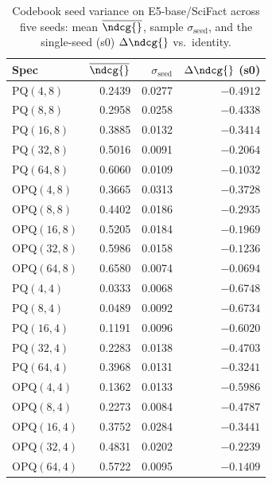 \begin{table}[t]
\centering
\small
\caption{Codebook seed variance on E5-base/SciFact across five seeds: mean $\overline{\ndcg{}}$, sample $\sigma_{\text{seed}}$, and the single-seed (s0) $\Delta\ndcg{}$ vs.\ identity.}
\label{tab:seed-variance-e5-base-scifact}
\begin{tabular}{lrrr}
\toprule
Spec & $\overline{\ndcg{}}$ & $\sigma_{\text{seed}}$ & $\Delta\ndcg{}$ (s0) \\
\midrule
PQ$(4,8)$ & 0.2439 & 0.0277 & $-0.4912$ \\
PQ$(8,8)$ & 0.2958 & 0.0258 & $-0.4338$ \\
PQ$(16,8)$ & 0.3885 & 0.0132 & $-0.3414$ \\
PQ$(32,8)$ & 0.5016 & 0.0091 & $-0.2064$ \\
PQ$(64,8)$ & 0.6060 & 0.0109 & $-0.1032$ \\
OPQ$(4,8)$ & 0.3665 & 0.0313 & $-0.3728$ \\
OPQ$(8,8)$ & 0.4402 & 0.0186 & $-0.2935$ \\
OPQ$(16,8)$ & 0.5205 & 0.0184 & $-0.1969$ \\
OPQ$(32,8)$ & 0.5986 & 0.0158 & $-0.1236$ \\
OPQ$(64,8)$ & 0.6580 & 0.0074 & $-0.0694$ \\
PQ$(4,4)$ & 0.0333 & 0.0068 & $-0.6748$ \\
PQ$(8,4)$ & 0.0489 & 0.0092 & $-0.6734$ \\
PQ$(16,4)$ & 0.1191 & 0.0096 & $-0.6020$ \\
PQ$(32,4)$ & 0.2283 & 0.0138 & $-0.4703$ \\
PQ$(64,4)$ & 0.3968 & 0.0131 & $-0.3241$ \\
OPQ$(4,4)$ & 0.1362 & 0.0133 & $-0.5986$ \\
OPQ$(8,4)$ & 0.2273 & 0.0084 & $-0.4787$ \\
OPQ$(16,4)$ & 0.3752 & 0.0284 & $-0.3441$ \\
OPQ$(32,4)$ & 0.4831 & 0.0202 & $-0.2239$ \\
OPQ$(64,4)$ & 0.5722 & 0.0095 & $-0.1409$ \\
\bottomrule
\end{tabular}
\end{table}

